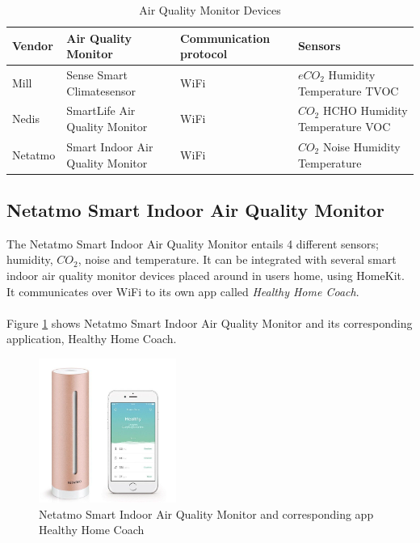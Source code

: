 \begin{table}[H]
    \centering
    \caption{Air Quality Monitor Devices}
    \begin{tabular}{| p{1.5cm} | p{5.5cm} | p{3cm} | p{2cm} |} 
        \hline
        \textbf{Vendor} & \textbf{Air Quality Monitor} & \textbf{Communication protocol} & \textbf{Sensors} \\
        \hline
        Mill & Sense Smart Climatesensor & WiFi & \(eCO_2\) \newline Humidity \newline Temperature \newline TVOC \\
        \hline
        Nedis & SmartLife Air Quality Monitor & WiFi & \(CO_2\) \newline HCHO \newline Humidity \newline Temperature \newline VOC \\
        \hline
        Netatmo & Smart Indoor Air Quality Monitor & WiFi & \(CO_2\) \newline Noise \newline Humidity \newline Temperature \\
        \hline
    \end{tabular}
    \label{tab:AQMSurvey}
\end{table}

\subsection{Netatmo Smart Indoor Air Quality Monitor}
The Netatmo Smart Indoor Air Quality Monitor entails 4 different sensors; humidity, \(CO_2\), noise and temperature. It can be integrated with several smart indoor air quality monitor devices placed around in users home, using HomeKit. It communicates over WiFi to its own app called \textit{Healthy Home Coach}. 
\\\\
Figure \ref{fig:Netatmo} shows Netatmo Smart Indoor Air Quality Monitor and its corresponding application, Healthy Home Coach. 
\begin{figure} [H]
    \centering
    \includegraphics[width=0.4\textwidth]{figures/Netatmo.png}
    \caption{Netatmo Smart Indoor Air Quality Monitor and corresponding app Healthy Home Coach \cite{NetatmoDevice}}
    \label{fig:Netatmo}
\end{figure}

